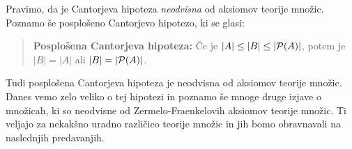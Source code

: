 Pravimo, da je Cantorjeva hipoteza \emph{neodvisna} od aksiomov teorije množic. Poznamo še posplošeno Cantorjevo hipotezo, ki se glasi:
%
\begin{quote}
  \textbf{Posplošena Cantorjeva hipoteza:}
  Če je $|A| \leq |B| \leq |\mathcal{P}(A)|$, potem je $|B| = |A|$ ali $|B| = |\mathcal{P}(A)|$.
\end{quote}
%
Tudi posplošena Cantorjeva hipoteza je neodvisna od aksiomov teorije množic.
Danes vemo zelo veliko o tej hipotezi in poznamo še mnoge druge izjave o množicah, ki so neodvisne od Zermelo-Fraenkelovih aksiomov teorije množic.
Ti veljajo za nekakšno uradno različico teorije množic in jih bomo obravnavali na naslednjih predavanjih.


